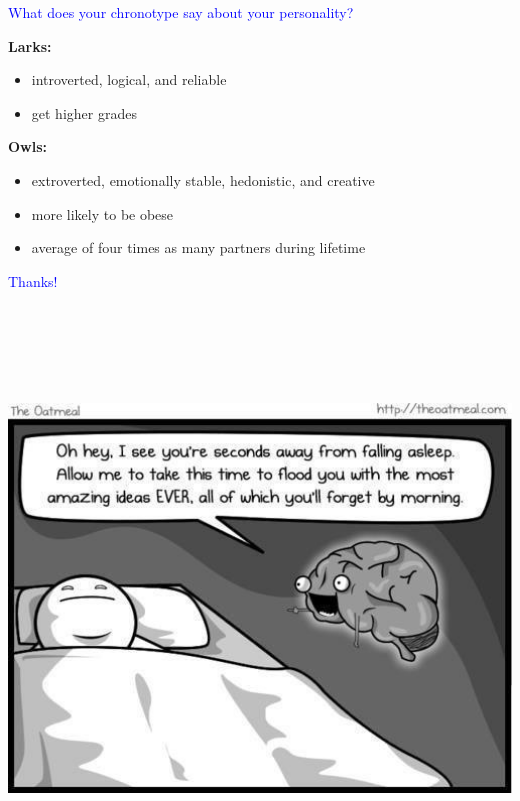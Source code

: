 \documentclass[landscape]{slides}
\begin{document}
\begin{slide}

    \textcolor{blue}{\Large{What does your chronotype say about your personality?}}

    \textbf{Larks:}

    \begin{itemize}
        \item introverted, logical, and reliable
        \item get higher grades
    \end{itemize}

    \textbf{Owls:}

    \begin{itemize}
        \item extroverted, emotionally stable, hedonistic, and creative
        \item more likely to be obese
        \item average of four times as many partners during lifetime
    \end{itemize}

\end{slide}






\begin{slide}

    \textcolor{blue}{\Large{Thanks!}}

    \begin{center}
        \includegraphics[height=15.5cm]{oatmeal-sleep-brain}
    \end{center}

\end{slide}
\end{document}

